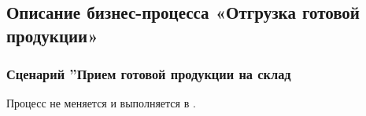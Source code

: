 \subsection{Описание бизнес-процесса «Отгрузка готовой продукции»}
\label{bp:goods}

\subsubsection{Сценарий ''Прием готовой продукции на склад}
\label{bp:goods_1}

Процесс не меняется и выполняется в \erp.




